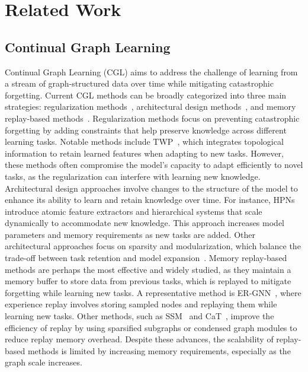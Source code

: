 \section{Related Work}
\subsection{Continual Graph Learning}

Continual Graph Learning (CGL) aims to address the challenge of learning from a stream of graph-structured data over time while mitigating catastrophic forgetting. Current CGL methods can be broadly categorized into three main strategies: regularization methods~\cite{liu2021overcoming}, architectural design methods~\cite{zhang2022hierarchical, zhang2023continual}, and memory replay-based methods~\cite{zhou2021overcoming, kim2022dygrain, zhang2022sparsified, liu2023cat, zhang2023ricci}. Regularization methods focus on preventing catastrophic forgetting by adding constraints that help preserve knowledge across different learning tasks. Notable methods include TWP~\cite{liu2021overcoming}, which integrates topological information to retain learned features when adapting to new tasks. However, these methods often compromise the model's capacity to adapt efficiently to novel tasks, as the regularization can interfere with learning new knowledge. Architectural design approaches involve changes to the structure of the model to enhance its ability to learn and retain knowledge over time. For instance, HPNs~\cite{zhang2022hierarchical} introduce atomic feature extractors and hierarchical systems that scale dynamically to accommodate new knowledge. This approach increases model parameters and memory requirements as new tasks are added. Other architectural approaches focus on sparsity and modularization, which balance the trade-off between task retention and model expansion~\cite{zhang2023continual}. Memory replay-based methods are perhaps the most effective and widely studied, as they maintain a memory buffer to store data from previous tasks, which is replayed to mitigate forgetting while learning new tasks. A representative method is ER-GNN~\cite{zhou2021overcoming}, where experience replay involves storing sampled nodes and replaying them while learning new tasks. Other methods, such as SSM~\cite{zhang2022sparsified} and CaT~\cite{liu2023cat}, improve the efficiency of replay by using sparsified subgraphs or condensed graph modules to reduce replay memory overhead. Despite these advances, the scalability of replay-based methods is limited by increasing memory requirements, especially as the graph scale increases. 

